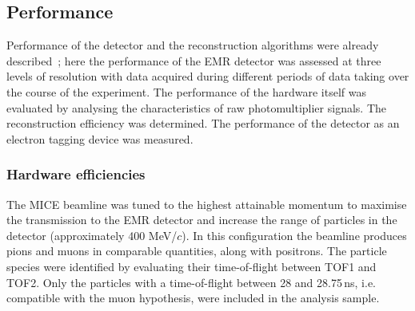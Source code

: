 \subsection{Performance}
\label{SubSect:EMR_Performance}

Performance of the detector and the reconstruction algorithms were already described~\cite{2015JInst..10P2012A}; here the performance of the EMR detector was assessed at three levels of resolution with data acquired during different periods of data taking over the course of the experiment.
The performance of the hardware itself was evaluated by analysing the characteristics of raw photomultiplier signals. The reconstruction efficiency was determined. The performance of the detector as an electron tagging device was measured.

\subsubsection{Hardware efficiencies}
The MICE beamline was tuned to the highest attainable momentum to maximise the transmission to the EMR detector and increase the range of particles in the detector (approximately 400 MeV/$c$). In this configuration the beamline produces pions and muons in comparable quantities, along with positrons. The particle species were identified by evaluating their time-of-flight between TOF1 and TOF2.
Only the particles with a time-of-flight between 28 and 28.75\,ns, i.e. compatible with the muon hypothesis, were included in the analysis sample.


